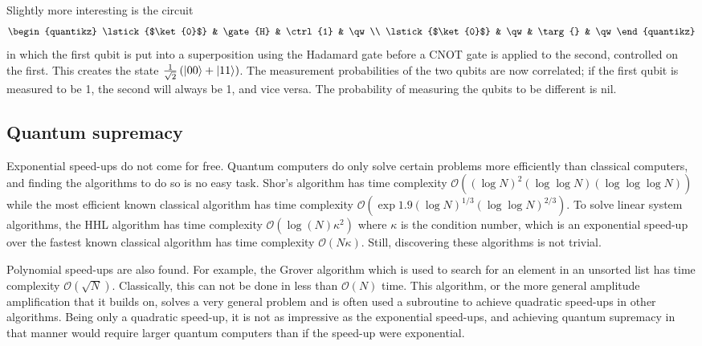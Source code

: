 Slightly more interesting is the circuit
\begin{equation}
    \begin{quantikz}
        \lstick{$\ket{0}$} & \gate{H} & \ctrl{1} & \qw \\
        \lstick{$\ket{0}$} & \qw & \targ{} & \qw
    \end{quantikz}
\end{equation}
in which the first qubit is put into a superposition using the Hadamard gate before a CNOT gate is applied to the second, controlled on the first.
This creates the state $\frac{1}{\sqrt{2}}\left(\ket{00} + \ket{11}\right)$.
The measurement probabilities of the two qubits are now correlated; if the first qubit is measured to be 1, the second will always be 1, and vice versa.
The probability of measuring the qubits to be different is nil.

\subsection{Quantum supremacy}
Exponential speed-ups do not come for free.
Quantum computers do only solve certain problems more efficiently than classical computers, and finding the algorithms to do so is no easy task.
Shor's algorithm has time complexity $\mathcal{O}((\log N)^2 (\log \log N) (\log \log \log N))$ while the most efficient known classical algorithm has time complexity $\mathcal{O}(\exp{1.9(\log N)^{1/3}(\log \log N)^{2/3}})$.
To solve linear system algorithms, the HHL algorithm has time complexity $\mathcal{O}(\log(N)\kappa^2)$ where $\kappa$ is the condition number, which is an exponential speed-up over the fastest known classical algorithm has time complexity $\mathcal{O}(N \kappa)$.
Still, discovering these algorithms is not trivial.

Polynomial speed-ups are also found.
For example, the Grover algorithm which is used to search for an element in an unsorted list has time complexity $\mathcal{O}(\sqrt{N})$.
Classically, this can not be done in less than $\mathcal{O}(N)$ time.
This algorithm, or the more general amplitude amplification that it builds on, solves a very general problem and is often used a subroutine to achieve quadratic speed-ups in other algorithms.
Being only a quadratic speed-up, it is not as impressive as the exponential speed-ups,
and achieving quantum supremacy in that manner would require larger quantum computers than if the speed-up were exponential.
